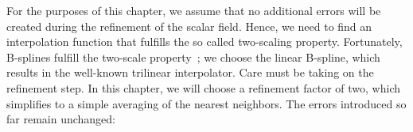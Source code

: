 
For the purposes of this chapter, we assume that no additional 
errors will be created during the refinement of the scalar field. 
Hence, we need to find an interpolation function that fulfills the 
so called two-scaling property. Fortunately, B-splines fulfill the 
two-scale property~\cite{799930}; we choose the linear B-spline, 
which results in the well-known trilinear interpolator. Care must 
be taking on the refinement step. In this chapter, we will choose a 
refinement factor of two, which simplifies to a simple averaging of 
the nearest neighbors. The errors introduced so far remain 
unchanged:

